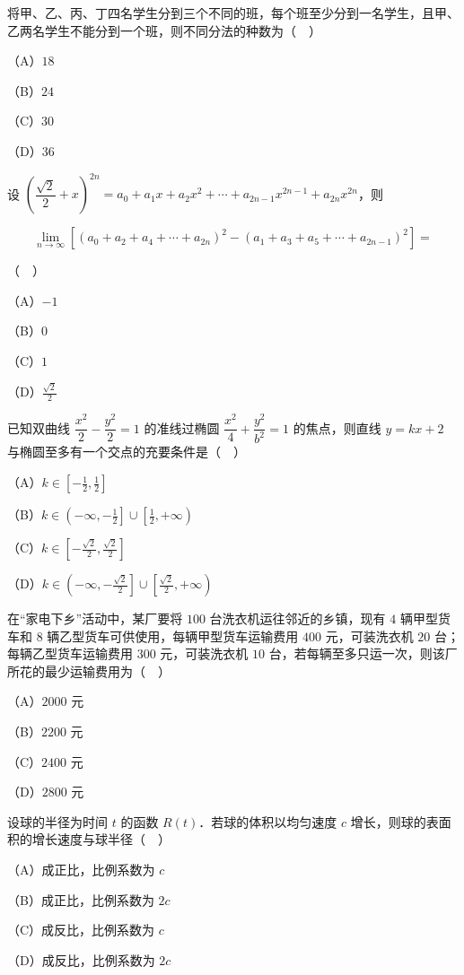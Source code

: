\begin{question}
将甲、乙、丙、丁四名学生分到三个不同的班，每个班至少分到一名学生，且甲、乙两名学生不能分到一个班，则不同分法的种数为（　）

（A）$18$

（B）$24$

（C）$30$

（D）$36$

\end{question}
\begin{question}
设 $\left(\dfrac{\sqrt2}{2}+x\right)^{2n}=a_0+a_1x+a_2x^2+\cdots+a_{2n-1}x^{2n-1}+a_{2n}x^{2n}$，则

\nopagebreak[4]
\[\lim_{n\to\infty}\left[(a_0+a_2+a_4+\cdots+a_{2n})^2-(a_1+a_3+a_5+\cdots+a_{2n-1})^2\right]=\]

（　）

（A）$-1$

（B）$0$

（C）$1$

（D）$\frac{\sqrt2}{2}$

\end{question}
\begin{question}
已知双曲线 $\dfrac{x^2}{2}-\dfrac{y^2}{2}=1$ 的准线过椭圆 $\dfrac{x^2}{4}+\dfrac{y^2}{b^2}=1$ 的焦点，则直线 $y=kx+2$ 与椭圆至多有一个交点的充要条件是（　）

（A）$k\in\left[-\frac12,\frac12\right]$

（B）$k\in\left(-\infty,-\frac12\right]\cup\left[\frac12,+\infty\right)$

（C）$k\in\left[-\frac{\sqrt2}{2},\frac{\sqrt2}{2}\right]$

（D）$k\in\left(-\infty,-\frac{\sqrt2}{2}\right]\cup\left[\frac{\sqrt2}{2},+\infty\right)$

\end{question}
\begin{question}
在“家电下乡”活动中，某厂要将 $100$ 台洗衣机运往邻近的乡镇，现有 $4$ 辆甲型货车和 $8$ 辆乙型货车可供使用，每辆甲型货车运输费用 $400$ 元，可装洗衣机 $20$ 台；每辆乙型货车运输费用 $300$ 元，可装洗衣机 $10$ 台，若每辆至多只运一次，则该厂所花的最少运输费用为（　）

（A）$2000$ 元

（B）$2200$ 元

（C）$2400$ 元

（D）$2800$ 元

\end{question}
\begin{question}
设球的半径为时间 $t$ 的函数 $R(t)$．若球的体积以均匀速度 $c$ 增长，则球的表面积的增长速度与球半径（　）

（A）成正比，比例系数为 $c$

（B）成正比，比例系数为 $2c$

（C）成反比，比例系数为 $c$

（D）成反比，比例系数为 $2c$

\Needspace{0.4\textheight}
\end{question}
